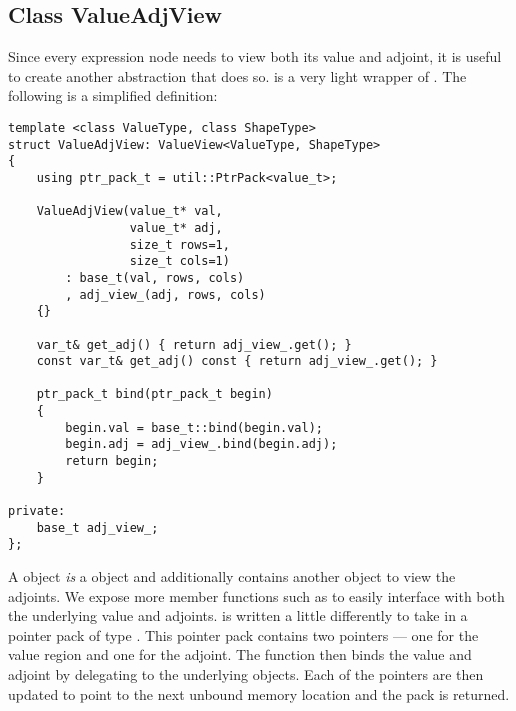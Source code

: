 \subsection{Class ValueAdjView}\label{ssec:value_adj_view}

Since every expression node needs to view both its value and adjoint,
it is useful to create another abstraction that does so.
 is a very light wrapper of .
The following is a simplified definition:
\begin{lstlisting}[style=customcpp]
template <class ValueType, class ShapeType>
struct ValueAdjView: ValueView<ValueType, ShapeType>
{
    using ptr_pack_t = util::PtrPack<value_t>;

    ValueAdjView(value_t* val, 
                 value_t* adj,
                 size_t rows=1, 
                 size_t cols=1)
        : base_t(val, rows, cols)
        , adj_view_(adj, rows, cols)
    {}
     
    var_t& get_adj() { return adj_view_.get(); }
    const var_t& get_adj() const { return adj_view_.get(); }

    ptr_pack_t bind(ptr_pack_t begin)
    { 
        begin.val = base_t::bind(begin.val);
        begin.adj = adj_view_.bind(begin.adj);
        return begin;
    }

private:
    base_t adj_view_;
};
\end{lstlisting}
A  object \emph{is} a  object
and additionally contains another  object to view the adjoints.
We expose more member functions such as  
to easily interface with both the underlying value and adjoints.
 is written a little differently to take in a pointer pack of type .
This pointer pack contains two pointers --- one for the value region and one for the adjoint.
The function then binds the value and adjoint by delegating to the underlying  objects.
Each of the pointers are then updated to point to the next unbound memory location and the pack is returned.

